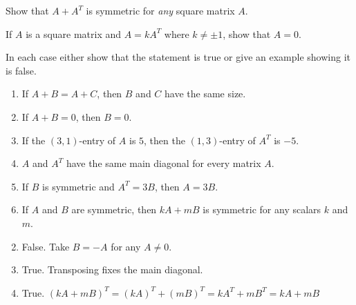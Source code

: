 \begin{multicols}{2}
\begin{ex}
\begin{sol}
\begin{enumerate}[label={\alph*.}]
\end{enumerate}
\end{sol}
\end{ex}

\begin{ex}
Show that $A + A^{T}$ is symmetric for \textit{any} square matrix $A$.
\end{ex}

\begin{ex}
If $A$ is a square matrix and $A = kA^{T}$ where $k \neq \pm 1$, show that $A = 0$.
\end{ex}

\begin{ex}
In each case either show that the statement is true or give an example showing it is false.


\begin{enumerate}[label={\alph*.}]
\item If $A + B = A + C$, then $B$ and $C$ have the same size.

\item If $A + B = 0$, then $B = 0$.

\item If the $(3, 1)$-entry of $A$ is $5$, then the $(1, 3)$-entry of $A^{T}$ is $-5$.

\item $A$ and $A^{T}$ have the same main diagonal for every matrix $A$.

\item If $B$ is symmetric and $A^{T} = 3B$, then $A = 3B$.

\item If $A$ and $B$ are symmetric, then $kA + mB$ is symmetric for any scalars $k$ and $m$.

\end{enumerate}
\begin{sol}
\begin{enumerate}[label={\alph*.}]
\setcounter{enumi}{1}
\item  False. Take $B = -A$ for any $A \neq 0$.

\setcounter{enumi}{3}
\item True. Transposing fixes the main diagonal. 

\setcounter{enumi}{5}
\item True. $(kA + mB)^{T} = (kA)^{T} + (mB)^{T} = kA^{T} + mB^{T} = kA + mB$

\end{enumerate}
\end{sol}
\end{ex}



\end{multicols}
